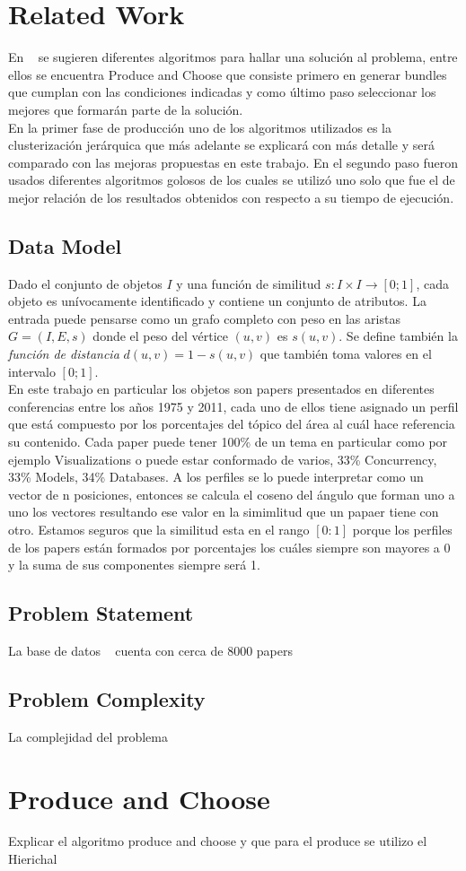 \section{Related Work}
En ~\cite{compositeRetrival} se sugieren diferentes algoritmos para hallar una solución al problema, entre ellos se encuentra Produce and Choose que consiste primero en generar bundles que cumplan con las condiciones indicadas y como último paso seleccionar los mejores que formarán parte de la solución.\\
En la primer fase de producción uno de los algoritmos utilizados es la clusterización jerárquica que más adelante se explicará con más detalle y será comparado con las mejoras propuestas en este trabajo. En el segundo paso fueron usados diferentes algoritmos golosos de los cuales se utilizó uno solo que fue el de mejor relación de los resultados obtenidos con respecto a su tiempo de ejecución.
\subsection{Data Model}
Dado el conjunto de objetos $I$ y una función de similitud $ s: I \times I \rightarrow [0;1]$, cada objeto es unívocamente identificado y contiene un conjunto de atributos. La entrada puede pensarse como un grafo completo con peso en las aristas $G=(I,E,s)$ donde el peso del vértice $(u,v)$ es $s(u,v)$. Se define también la \textit{función de distancia} $d(u,v) = 1 - s(u,v)$ que también toma valores en el intervalo $[0;1]$.\\
En este trabajo en particular los objetos son papers presentados en diferentes conferencias entre los años 1975 y 2011, cada uno de ellos tiene asignado un perfil que está compuesto por los porcentajes del tópico del área al cuál hace referencia su contenido. Cada paper puede tener 100\% de un tema en particular como por ejemplo Visualizations o puede estar conformado de varios, 33\% Concurrency, 33\% Models, 34\% Databases. A los perfiles se lo puede interpretar como un vector de n posiciones, entonces se calcula el coseno del ángulo que forman uno a uno los vectores resultando ese valor en la simimlitud que un papaer tiene con otro. Estamos seguros que la similitud esta en el rango $[0:1]$ porque los perfiles de los papers están formados por porcentajes los cuáles siempre son mayores a 0 y la suma de sus componentes siempre será 1.
\subsection{Problem Statement}
La base de datos ~\cite{dataDrive} cuenta con cerca de 8000 papers 
\subsection{Problem Complexity}
La complejidad del problema
\section{Produce and Choose}
Explicar el algoritmo produce and choose y que para el produce se utilizo el Hierichal
